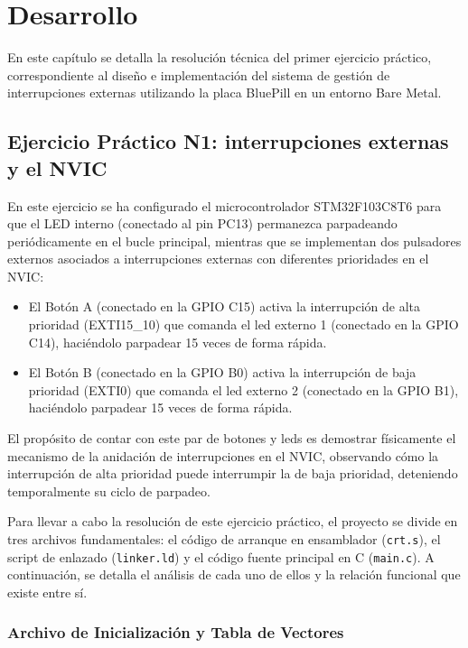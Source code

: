\chapter{Desarrollo}
\label{ch:desarrollo}

En este capítulo se detalla la resolución técnica del primer ejercicio práctico, correspondiente al diseño e
implementación del sistema de gestión de interrupciones externas utilizando la placa BluePill en un entorno Bare Metal.

\section{Ejercicio Práctico N1: interrupciones externas y el NVIC}
\label{sec.ej1:interrupciones}

En este ejercicio se ha configurado el microcontrolador STM32F103C8T6 para que el LED
interno (conectado al pin PC13) permanezca parpadeando periódicamente en el bucle principal, mientras que se
implementan dos pulsadores externos asociados a interrupciones externas con diferentes prioridades en el NVIC:
\begin{itemize}
    \item El Botón A (conectado en la GPIO C15) activa la interrupción de alta 
    prioridad (EXTI15\_10) que comanda el led externo 1 (conectado en la GPIO C14), haciéndolo parpadear 15 veces de forma rápida.
    \item El Botón B (conectado en la GPIO B0) activa la interrupción de baja prioridad (EXTI0)
    que comanda el led externo 2 (conectado en la GPIO B1), haciéndolo parpadear 15 veces de forma rápida.
\end{itemize}

El propósito de contar con este par de botones y leds es demostrar físicamente el mecanismo de la
anidación de interrupciones en el NVIC, observando cómo la interrupción de alta prioridad puede interrumpir la de
baja prioridad, deteniendo temporalmente su ciclo de parpadeo.

Para llevar a cabo la resolución de este ejercicio práctico, el proyecto se divide en tres archivos fundamentales: el
código de arranque en ensamblador (\texttt{crt.s}), el script de enlazado (\texttt{linker.ld}) y el código fuente
principal en C (\texttt{main.c}). A continuación, se detalla el análisis de cada uno de ellos y la relación funcional
que existe entre sí.

\subsection{Archivo de Inicialización y Tabla de Vectores}
\label{sec.ej1:inicializacion}

